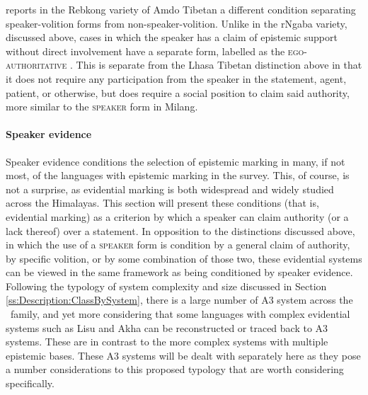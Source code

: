  reports in the Rebkong variety of Amdo Tibetan a different condition separating speaker-volition forms from non-speaker-volition. Unlike in the rNgaba variety, discussed above, cases in which the speaker has a claim of epistemic support without direct involvement have a separate form, labelled as the \textsc{ego-authoritative} \cite[300]{Simon2021}. This is separate from the Lhasa Tibetan distinction above in that it does not require any participation from the speaker in the statement, agent, patient, or otherwise, but does require a social position to claim said authority, more similar to the \textsc{speaker} form in Milang.

\paragraph{Speaker evidence}
Speaker evidence conditions the selection of epistemic marking in many, if not most, of the languages with epistemic marking in the survey. This, of course, is not a surprise, as evidential marking is both widespread and widely studied across the Himalayas. This section will present these conditions (that is, evidential marking) as a criterion by which a speaker can claim authority (or a lack thereof) over a statement. In opposition to the distinctions discussed above, in which the use of a \textsc{speaker} form is condition by a general claim of authority, by specific volition, or by some combination of those two, these evidential systems can be viewed in the same framework as being conditioned by speaker evidence. Following the typology of system complexity and size discussed in Section \ref{ss:Description:ClassBySystem}, there is a large number of A3 system across the \lfam\ family, and yet more considering that some languages with complex evidential systems such as Lisu \cite{Bradley2002} and Akha \cite{Thurgood1986} can be reconstructed or traced back to A3 systems. These are in contrast to the more complex systems with multiple epistemic bases. These A3 systems will be dealt with separately here as they pose a number considerations to this proposed typology that are worth considering specifically. 

